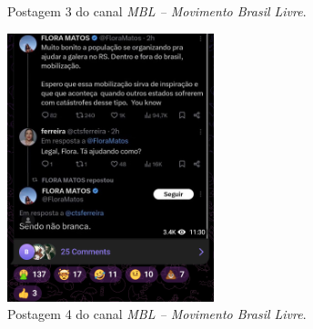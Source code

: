 \documentclass[portuguese]{textolivre}
\begin{document}
\begin{figure}[h!]
\begin{minipage}[t]{0.3\textwidth}
        \caption{Postagem 3 do canal \emph{MBL -- Movimento Brasil Livre}.}
        \label{fig-20}
    \end{minipage}

    \vspace{0.5cm} %

    \begin{minipage}[t]{0.40\textwidth}
        \centering
        \includegraphics[width=\linewidth]{Imagens/Fig21.png}
        \caption{Postagem 4 do canal \emph{MBL -- Movimento Brasil Livre}.}
        \label{fig-21}
    \end{minipage}
    \hfill
    \begin{minipage}[t]{0.34\textwidth}
        \centering

\end{minipage}
\end{figure}
\end{document}
